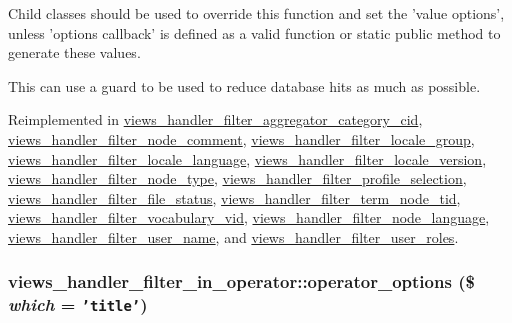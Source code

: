 Child classes should be used to override this function and set the 'value options', unless 'options callback' is defined as a valid function or static public method to generate these values.

This can use a guard to be used to reduce database hits as much as possible. 

Reimplemented in \hyperlink{classviews__handler__filter__aggregator__category__cid_d0fa87d5c7f9bcb955b163c6587cd790}{views\_\-handler\_\-filter\_\-aggregator\_\-category\_\-cid}, \hyperlink{classviews__handler__filter__node__comment_5f547b83a8bc376d88ba58b75777a12e}{views\_\-handler\_\-filter\_\-node\_\-comment}, \hyperlink{classviews__handler__filter__locale__group_605b3625db570715d94299f05200a9c7}{views\_\-handler\_\-filter\_\-locale\_\-group}, \hyperlink{classviews__handler__filter__locale__language_ca1d25b19b4be6fa8e5745d15a0a07c1}{views\_\-handler\_\-filter\_\-locale\_\-language}, \hyperlink{classviews__handler__filter__locale__version_f0f2577c03733a4f9d1cd2d931329edd}{views\_\-handler\_\-filter\_\-locale\_\-version}, \hyperlink{classviews__handler__filter__node__type_27870f3af15cf44cae4e3440a3ccce67}{views\_\-handler\_\-filter\_\-node\_\-type}, \hyperlink{classviews__handler__filter__profile__selection_83d4168bf90f6906fc4cc9db17193d0c}{views\_\-handler\_\-filter\_\-profile\_\-selection}, \hyperlink{classviews__handler__filter__file__status_06c9422d87bde6108c51d45e9d5568f4}{views\_\-handler\_\-filter\_\-file\_\-status}, \hyperlink{classviews__handler__filter__term__node__tid_78e569201a5b833da4aafbf325a77c44}{views\_\-handler\_\-filter\_\-term\_\-node\_\-tid}, \hyperlink{classviews__handler__filter__vocabulary__vid_f4ac6b0c4da1408c4a96e096412eae3a}{views\_\-handler\_\-filter\_\-vocabulary\_\-vid}, \hyperlink{classviews__handler__filter__node__language_fa97fc909a4394a9a69cd02e952afb66}{views\_\-handler\_\-filter\_\-node\_\-language}, \hyperlink{classviews__handler__filter__user__name_039044fb84e609938564ae6c8a40580c}{views\_\-handler\_\-filter\_\-user\_\-name}, and \hyperlink{classviews__handler__filter__user__roles_9fcc092575dde958d1b50bb05c0243a3}{views\_\-handler\_\-filter\_\-user\_\-roles}.\hypertarget{classviews__handler__filter__in__operator_5b972dd25d26a7010ae9f63cbc926577}{
\subsubsection[{operator\_\-options}]{\setlength{\rightskip}{0pt plus 5cm}views\_\-handler\_\-filter\_\-in\_\-operator::operator\_\-options (\$ {\em which} = {\tt 'title'})}}
\label{classviews__handler__filter__in__operator_5b972dd25d26a7010ae9f63cbc926577}


